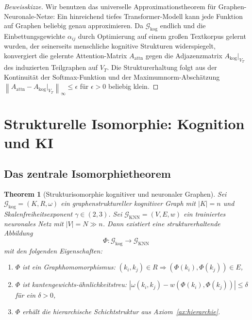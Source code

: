 ﻿\documentclass[12pt,a4paper]{article}
\theoremstyle{plain}
\newtheorem{theorem}{Theorem}[section]
\theoremstyle{definition}
\theoremstyle{remark}
\newcommand{\GG}{\mathcal{G}}
\newcommand{\KNN}{\text{KNN}}
\newcommand{\norm}[1]{\left\|#1\right\|}
\begin{document}
\begin{proof}[Beweisskizze]
Wir benutzen das universelle Approximationstheorem für Graphen-Neuro\-nale-Netze: Ein hinreichend tiefes Transformer-Modell kann jede Funktion auf Graphen beliebig genau approximieren. Da $\GG_{\text{kog}}$ endlich und die Einbettungsgewichte $\alpha_{ij}$ durch Optimierung auf einem großen Textkorpus gelernt wurden, der seinerseits menschliche kognitive Strukturen widerspiegelt, konvergiert die gelernte Attention-Matrix $A_{\text{attn}}$ gegen die Adjazenzmatrix $A_{\text{kog}}|_{V_T}$ des induzierten Teilgraphen auf $V_T$. Die Strukturerhaltung folgt aus der Kontinuität der Softmax-Funktion und der Maximumnorm-Abschätzung $\norm{A_{\text{attn}} - A_{\text{kog}}|_{V_T}}_\infty \leq \epsilon$ für $\epsilon > 0$ beliebig klein.
\end{proof}

\section{Strukturelle Isomorphie: Kognition und KI}
\label{sec:isomorphie}

\subsection{Das zentrale Isomorphietheorem}

\begin{theorem}[Strukturisomorphie kognitiver und neuronaler Graphen]
\label{thm:hauptsatz}
Sei $\GG_{\text{kog}} = (K, R, \omega)$ ein graphenstruktureller kognitiver Graph mit $|K| = n$ und Skalenfreiheitsexponent $\gamma \in (2,3)$. Sei $\GG_{\KNN} = (V, E, w)$ ein trainiertes neuronales Netz mit $|V| = N \gg n$. Dann existiert eine strukturerhaltende Abbildung
\[
  \Phi: \GG_{\text{kog}} \to \GG_{\KNN}
\]
mit den folgenden Eigenschaften:
\begin{enumerate}[label=(\roman*)]
  \item $\Phi$ ist ein Graphhomomorphismus: $(k_i, k_j) \in R \Rightarrow (\Phi(k_i), \Phi(k_j)) \in E$,
  \item $\Phi$ ist \emph{kantengewichts-ähnlichkeitstreu}: $\left|\omega(k_i,k_j) - w(\Phi(k_i), \Phi(k_j))\right| \leq \delta$ für ein $\delta > 0$,
  \item $\Phi$ erhält die hierarchische Schichtstruktur aus Axiom~\ref{ax:hierarchie}.
\end{enumerate}
\end{theorem}
\end{document}
